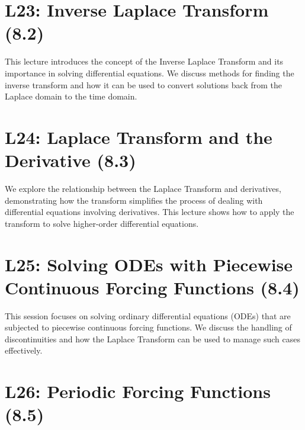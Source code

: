 \documentclass[
  letterpaper,
  DIV=11,
  numbers=noendperiod]{scrreprt}
\theoremstyle{plain}
\theoremstyle{remark}
\begin{document}
\section*{L23: Inverse Laplace Transform
(8.2)}\label{l23-inverse-laplace-transform-8.2}


This lecture introduces the concept of the Inverse Laplace Transform and
its importance in solving differential equations. We discuss methods for
finding the inverse transform and how it can be used to convert
solutions back from the Laplace domain to the time domain.

\section*{L24: Laplace Transform and the Derivative
(8.3)}\label{l24-laplace-transform-and-the-derivative-8.3}


We explore the relationship between the Laplace Transform and
derivatives, demonstrating how the transform simplifies the process of
dealing with differential equations involving derivatives. This lecture
shows how to apply the transform to solve higher-order differential
equations.

\section*{L25: Solving ODEs with Piecewise Continuous Forcing Functions
(8.4)}\label{l25-solving-odes-with-piecewise-continuous-forcing-functions-8.4}


This session focuses on solving ordinary differential equations (ODEs)
that are subjected to piecewise continuous forcing functions. We discuss
the handling of discontinuities and how the Laplace Transform can be
used to manage such cases effectively.

\section*{L26: Periodic Forcing Functions
(8.5)}\label{l26-periodic-forcing-functions-8.5}
\end{document}
